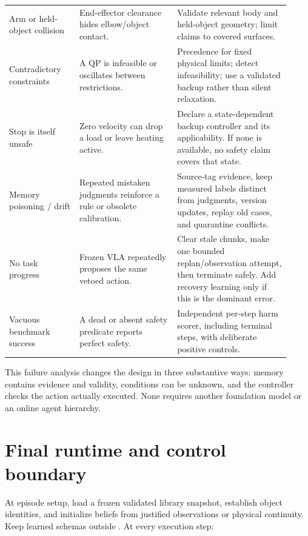 \documentclass[10pt]{article}
\newcommand{\code}[1]{\texttt{\detokenize{#1}}}
\begin{document}
\begin{longtable}{p{0.23\linewidth}p{0.32\linewidth}p{0.37\linewidth}}
Arm or held-object collision & End-effector clearance hides elbow/object contact. & Validate relevant body and held-object geometry; limit claims to covered surfaces.\\
Contradictory constraints & A QP is infeasible or oscillates between restrictions. & Precedence for fixed physical limits; detect infeasibility; use a validated backup rather than silent relaxation.\\
Stop is itself unsafe & Zero velocity can drop a load or leave heating active. & Declare a state-dependent backup controller and its applicability. If none is available, no safety claim covers that state.\\
Memory poisoning / drift & Repeated mistaken judgments reinforce a rule or obsolete calibration. & Source-tag evidence, keep measured labels distinct from judgments, version updates, replay old cases, and quarantine conflicts.\\
No task progress & Frozen VLA repeatedly proposes the same vetoed action. & Clear stale chunks, make one bounded replan/observation attempt, then terminate safely. Add recovery learning only if this is the dominant error.\\
Vacuous benchmark success & A dead or absent safety predicate reports perfect safety. & Independent per-step harm scorer, including terminal steps, with deliberate positive controls.\\
\bottomrule
\end{longtable}
\normalsize

This failure analysis changes the design in three substantive ways: memory contains evidence and validity, conditions can be unknown, and the controller checks the action actually executed. None requires another foundation model or an online agent hierarchy.

\clearpage
\section{Final runtime and control boundary}
At episode setup, load a frozen validated library snapshot, establish object identities, and initialize beliefs from justified observations or physical continuity. Keep learned schemas outside \code{kb.clear()}. At every execution step:
\end{document}
